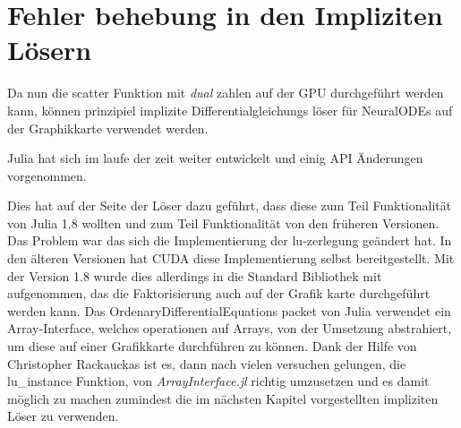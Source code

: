 \section{ Fehler behebung in den Impliziten Lösern }

Da nun die scatter Funktion mit \textit{dual} zahlen auf der GPU durchgeführt werden kann, 
können prinzipiel implizite Differentialgleichungs löser für 
NeuralODEs auf der Graphikkarte verwendet werden.

Julia hat sich im laufe der zeit weiter entwickelt und einig API Änderungen vorgenommen.

Dies hat auf der Seite der Löser dazu geführt, dass diese zum Teil Funktionalität von Julia 1.8 wollten 
und zum Teil Funktionalität von den früheren Versionen.
Das Problem war das sich die Implementierung der lu-zerlegung geändert hat. %
In den älteren Versionen hat CUDA diese Implementierung selbst bereitgestellt.
Mit der Version 1.8 wurde dies allerdings in die Standard Bibliothek mit aufgenommen, das die Faktorisierung 
auch auf der Grafik karte durchgeführt werden kann.
Das OrdenaryDifferentialEquations packet von Julia verwendet 
ein Array-Interface, welches operationen auf Arrays, 
von der Umsetzung abstrahiert, um diese auf einer Grafikkarte durchführen zu können.
Dank der Hilfe von Christopher Rackauckas ist es, dann nach vielen versuchen gelungen, die lu\_instance Funktion, von \textit{ArrayInterface.jl} richtig umzusetzen 
und es damit möglich zu machen zumindest die im nächsten Kapitel vorgestellten impliziten Löser zu verwenden.
